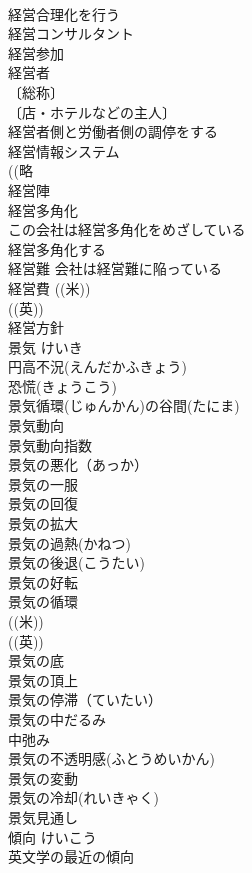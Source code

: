 \documentclass[8pt]{extreport}
\begin{document}
\begin{CJK}{UTF8}{min}
\\	経営合理化を行う 
\\	経営コンサルタント 
\\	経営参加 
\\	経営者 
\\	〔総称〕
\\	〔店・ホテルなどの主人〕
\\	経営者側と労働者側の調停をする 
\\	経営情報システム 
\\	((略
\\	経営陣 
\\	経営多角化 
\\	この会社は経営多角化をめざしている 
\\	経営多角化する 
\\	経営難 会社は経営難に陥っている 
\\	経営費 ((米)) 
\\	((英)) 
\\	経営方針 
\\	景気	けいき	
\\	円高不況(えんだかふきょう) 
\\	恐慌(きょうこう) 
\\	景気循環(じゅんかん)の谷間(たにま) 
\\	景気動向 
\\	景気動向指数 
\\	景気の悪化（あっか） 
\\	景気の一服 
\\	景気の回復 
\\	景気の拡大 
\\	景気の過熱(かねつ) 
\\	景気の後退(こうたい) 
\\	景気の好転 
\\	景気の循環 
\\	((米))
\\	((英))
\\	景気の底 
\\	景気の頂上 
\\	景気の停滞（ていたい） 
\\	景気の中だるみ 
\\	中弛み 
\\	景気の不透明感(ふとうめいかん) 
\\	景気の変動 
\\	景気の冷却(れいきゃく) 
\\	景気見通し 
\\	傾向	けいこう	
\\	英文学の最近の傾向 

\end{CJK}
\end{document}
